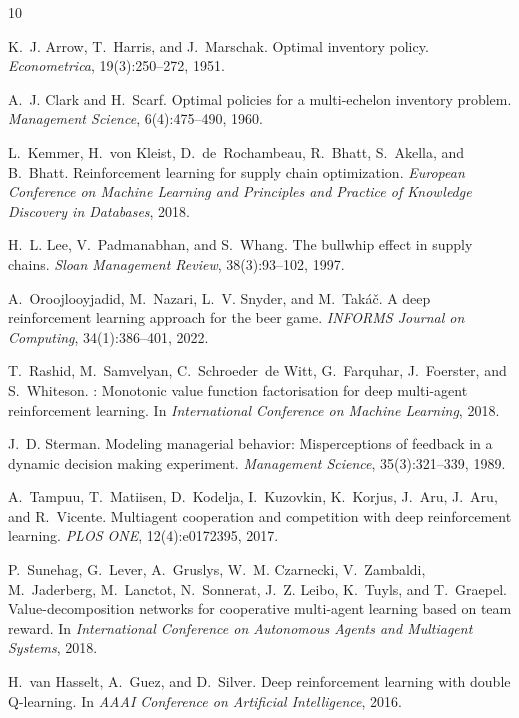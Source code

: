 \documentclass{article}
\begin{document}

\begin{thebibliography}{10}

K.~J. Arrow, T.~Harris, and J.~Marschak.
\newblock Optimal inventory policy.
\newblock \emph{Econometrica}, 19(3):250--272, 1951.

A.~J. Clark and H.~Scarf.
\newblock Optimal policies for a multi-echelon inventory problem.
\newblock \emph{Management Science}, 6(4):475--490, 1960.

L.~Kemmer, H.~von Kleist, D.~de~Rochambeau, R.~Bhatt, S.~Akella, and
  B.~Bhatt.
\newblock Reinforcement learning for supply chain optimization.
\newblock \emph{European Conference on Machine Learning and Principles and
  Practice of Knowledge Discovery in Databases}, 2018.

H.~L. Lee, V.~Padmanabhan, and S.~Whang.
\newblock The bullwhip effect in supply chains.
\newblock \emph{Sloan Management Review}, 38(3):93--102, 1997.

A.~Oroojlooyjadid, M.~Nazari, L.~V. Snyder, and M.~Tak{\'a}{\v{c}}.
\newblock A deep reinforcement learning approach for the beer game.
\newblock \emph{INFORMS Journal on Computing}, 34(1):386--401, 2022.

T.~Rashid, M.~Samvelyan, C.~Schroeder~de Witt, G.~Farquhar, J.~Foerster,
  and S.~Whiteson.
: Monotonic value function factorisation for deep multi-agent
  reinforcement learning.
\newblock In \emph{International Conference on Machine Learning}, 2018.

J.~D. Sterman.
\newblock Modeling managerial behavior: Misperceptions of feedback in a
  dynamic decision making experiment.
\newblock \emph{Management Science}, 35(3):321--339, 1989.

A.~Tampuu, T.~Matiisen, D.~Kodelja, I.~Kuzovkin, K.~Korjus, J.~Aru,
  J.~Aru, and R.~Vicente.
\newblock Multiagent cooperation and competition with deep reinforcement
  learning.
\newblock \emph{PLOS ONE}, 12(4):e0172395, 2017.

P.~Sunehag, G.~Lever, A.~Gruslys, W.~M. Czarnecki, V.~Zambaldi,
  M.~Jaderberg, M.~Lanctot, N.~Sonnerat, J.~Z. Leibo, K.~Tuyls, and
  T.~Graepel.
\newblock Value-decomposition networks for cooperative multi-agent learning
  based on team reward.
\newblock In \emph{International Conference on Autonomous Agents and
  Multiagent Systems}, 2018.

H.~van Hasselt, A.~Guez, and D.~Silver.
\newblock Deep reinforcement learning with double {Q}-learning.
\newblock In \emph{AAAI Conference on Artificial Intelligence}, 2016.

\end{thebibliography}
\end{document}
